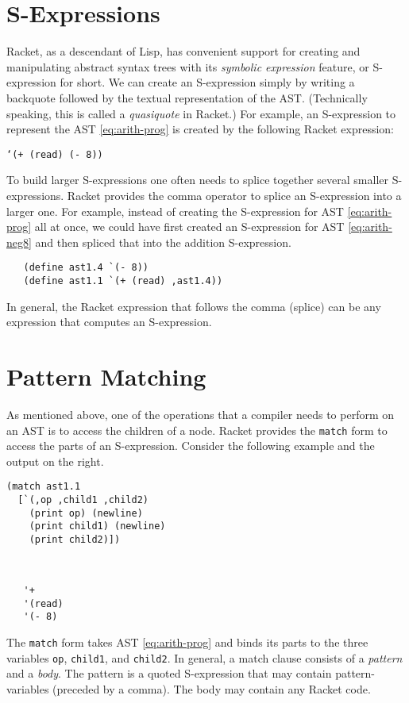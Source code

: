 \documentclass[11pt]{book}
\begin{document}
\section{S-Expressions}
\label{sec:s-expr}

Racket, as a descendant of Lisp, has
convenient support for creating and manipulating abstract syntax trees
with its \emph{symbolic expression} feature, or S-expression for
short. We can create an S-expression simply by writing a backquote
followed by the textual representation of the AST. (Technically
speaking, this is called a \emph{quasiquote} in Racket.)  For example,
an S-expression to represent the AST \eqref{eq:arith-prog} is created
by the following Racket expression:
\begin{center}
\texttt{`(+ (read) (- 8))}
\end{center}

To build larger S-expressions one often needs to splice together
several smaller S-expressions. Racket provides the comma operator to
splice an S-expression into a larger one. For example, instead of
creating the S-expression for AST \eqref{eq:arith-prog} all at once,
we could have first created an S-expression for AST
\eqref{eq:arith-neg8} and then spliced that into the addition
S-expression.
\begin{lstlisting}
   (define ast1.4 `(- 8))
   (define ast1.1 `(+ (read) ,ast1.4))
\end{lstlisting}
In general, the Racket expression that follows the comma (splice)
can be any expression that computes an S-expression.

\section{Pattern Matching}
\label{sec:pattern-matching}

As mentioned above, one of the operations that a compiler needs to
perform on an AST is to access the children of a node.  Racket
provides the \texttt{match} form to access the parts of an
S-expression. Consider the following example and the output on the
right.
\begin{center}
\begin{minipage}{0.5\textwidth}
\begin{lstlisting}
(match ast1.1
  [`(,op ,child1 ,child2)
    (print op) (newline)
    (print child1) (newline)
    (print child2)])
\end{lstlisting}
\end{minipage}
\vrule
\begin{minipage}{0.25\textwidth}
\begin{lstlisting}


   '+
   '(read)
   '(- 8)
\end{lstlisting}
\end{minipage}
\end{center}
The \texttt{match} form takes AST \eqref{eq:arith-prog} and binds its
parts to the three variables \texttt{op}, \texttt{child1}, and
\texttt{child2}. In general, a match clause consists of a
\emph{pattern} and a \emph{body}. The pattern is a quoted S-expression
that may contain pattern-variables (preceded by a comma).  The body
may contain any Racket code.
\end{document}
